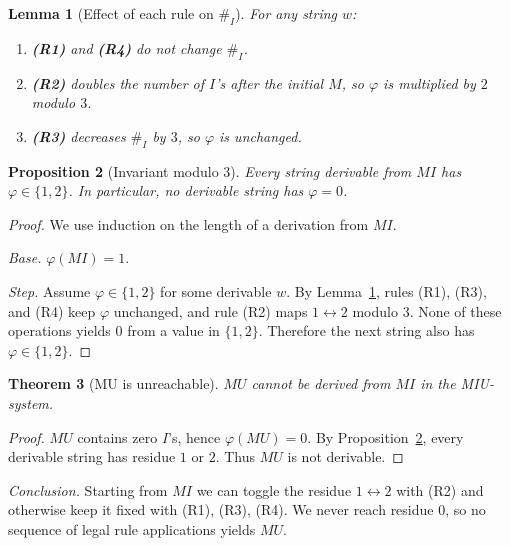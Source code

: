 \documentclass{article}
\theoremstyle{plain}
\newtheorem{theorem}{Theorem}[section]
\newtheorem{lemma}[theorem]{Lemma}
\newtheorem{proposition}[theorem]{Proposition}
\theoremstyle{definition}
\theoremstyle{remark}
\begin{document}
\begin{lemma}[Effect of each rule on $\#_I$]\label{lem:rule-effects}
For any string $w$:
\begin{enumerate}
    \item \textbf{(R1)} and \textbf{(R4)} do not change $\#_I$.
    \item \textbf{(R2)} doubles the number of $I$’s \emph{after} the initial $M$, so $\varphi$ is multiplied by $2$ modulo $3$.
    \item \textbf{(R3)} decreases $\#_I$ by $3$, so $\varphi$ is unchanged.
\end{enumerate}
\end{lemma}

\begin{proposition}[Invariant modulo $3$]\label{prop:invariant}
Every string derivable from $MI$ has $\varphi\in\{1,2\}$. In particular, no derivable string has $\varphi=0$.
\end{proposition}

\begin{proof}
We use induction on the length of a derivation from $MI$.

\emph{Base.} $\varphi(MI)=1$.

\emph{Step.} Assume $\varphi\in\{1,2\}$ for some derivable $w$.  
By Lemma~\ref{lem:rule-effects}, rules (R1), (R3), and (R4) keep $\varphi$ unchanged, and rule (R2) maps $1\leftrightarrow 2$ modulo $3$. None of these operations yields $0$ from a value in $\{1,2\}$. Therefore the next string also has $\varphi\in\{1,2\}$.
\end{proof}

\begin{theorem}[MU is unreachable]
\label{thm:mu-unreachable}
$MU$ cannot be derived from $MI$ in the MIU-system.
\end{theorem}

\begin{proof}
$MU$ contains zero $I$’s, hence $\varphi(MU)=0$. By Proposition~\ref{prop:invariant}, every derivable string has residue $1$ or $2$. Thus $MU$ is not derivable.
\end{proof}

\textit{Conclusion.} Starting from $MI$ we can toggle the residue $1\leftrightarrow 2$ with (R2) and otherwise keep it fixed with (R1), (R3), (R4). We never reach residue $0$, so no sequence of legal rule applications yields $MU$.
\end{document}
